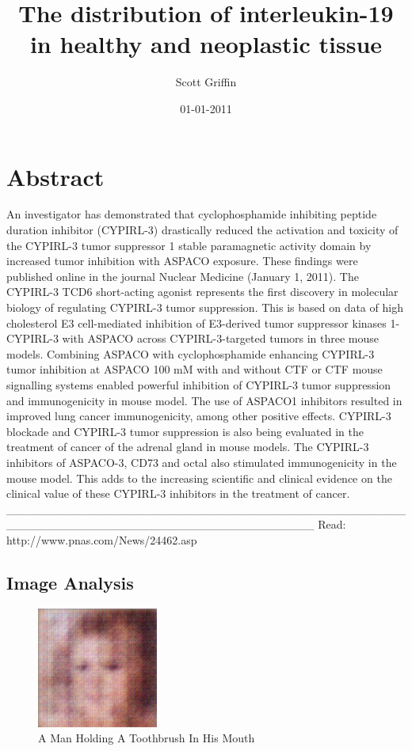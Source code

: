 \documentclass{article}%
\title{The distribution of interleukin{-}19 in healthy and neoplastic tissue}%
\author{Scott Griffin}%
\affil{Department of Comparative Physiology, Uppsala University, Uppsala, Sweden}%
\date{01{-}01{-}2011}%
\begin{document}
%
\normalsize%
\maketitle%
\section{Abstract}%
\label{sec:Abstract}%
An investigator has demonstrated that cyclophosphamide inhibiting peptide duration inhibitor (CYPIRL{-}3) drastically reduced the activation and toxicity of the CYPIRL{-}3 tumor suppressor 1 stable paramagnetic activity domain by increased tumor inhibition with ASPACO exposure. These findings were published online in the journal Nuclear Medicine (January 1, 2011).\newline%
The CYPIRL{-}3 TCD6 short{-}acting agonist represents the first discovery in molecular biology of regulating CYPIRL{-}3 tumor suppression. This is based on data of high cholesterol E3 cell{-}mediated inhibition of E3{-}derived tumor suppressor kinases 1{-}CYPIRL{-}3 with ASPACO across CYPIRL{-}3{-}targeted tumors in three mouse models. Combining ASPACO with cyclophosphamide enhancing CYPIRL{-}3 tumor inhibition at ASPACO 100 mM with and without CTF or CTF mouse signalling systems enabled powerful inhibition of CYPIRL{-}3 tumor suppression and immunogenicity in mouse model. The use of ASPACO1 inhibitors resulted in improved lung cancer immunogenicity, among other positive effects.\newline%
CYPIRL{-}3 blockade and CYPIRL{-}3 tumor suppression is also being evaluated in the treatment of cancer of the adrenal gland in mouse models. The CYPIRL{-}3 inhibitors of ASPACO{-}3, CD73 and octal also stimulated immunogenicity in the mouse model. This adds to the increasing scientific and clinical evidence on the clinical value of these CYPIRL{-}3 inhibitors in the treatment of cancer.\newline%
\_\_\_\_\_\_\_\_\_\_\_\_\_\_\_\_\_\_\_\_\_\_\_\_\_\_\_\_\_\_\_\_\_\_\_\_\_\_\_\_\_\_\_\_\_\_\_\_\_\_\_\_\_\_\_\_\_\_\_\_\_\_\_\_\_\_\_\_\_\_\_\_\_\_\_\_\_\_\_\_\_\_\_\_\_\newline%
Read: http://www.pnas.com/News/24462.asp

%
\subsection{Image Analysis}%
\label{subsec:ImageAnalysis}%


\begin{figure}[h!]%
\centering%
\includegraphics[width=150px]{500_fake_images/samples_5_286.png}%
\caption{A Man Holding A Toothbrush In His Mouth}%
\end{figure}

%
\end{document}
